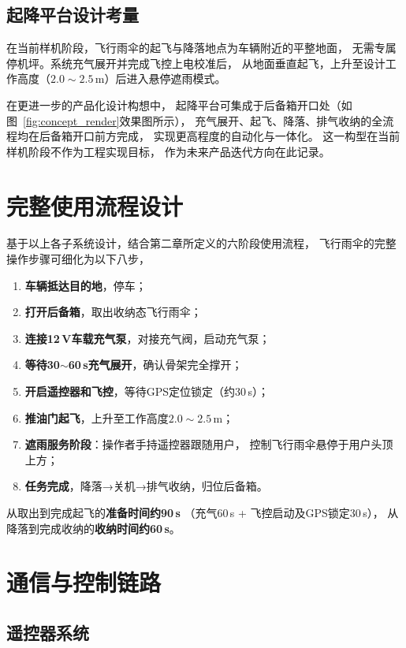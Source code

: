 \subsection{起降平台设计考量}

在当前样机阶段，飞行雨伞的起飞与降落地点为车辆附近的平整地面，
无需专属停机坪。系统充气展开并完成飞控上电校准后，
从地面垂直起飞，上升至设计工作高度（$2.0\sim2.5$\,m）后进入悬停遮雨模式。

在更进一步的产品化设计构想中，
起降平台可集成于后备箱开口处（如图~\ref{fig:concept_render}效果图所示），
充气展开、起飞、降落、排气收纳的全流程均在后备箱开口前方完成，
实现更高程度的自动化与一体化。
这一构型在当前样机阶段不作为工程实现目标，
作为未来产品迭代方向在此记录。


\section{完整使用流程设计}
基于以上各子系统设计，结合第二章所定义的六阶段使用流程，
飞行雨伞的完整操作步骤可细化为以下八步，


\begin{enumerate}
    \item \textbf{车辆抵达目的地}，停车；
    \item \textbf{打开后备箱}，取出收纳态飞行雨伞；
    \item \textbf{连接12\,V车载充气泵}，对接充气阀，启动充气泵；
    \item \textbf{等待30$\sim$60\,s充气展开}，确认骨架完全撑开；
    \item \textbf{开启遥控器和飞控}，等待GPS定位锁定（约30\,s）；
    \item \textbf{推油门起飞}，上升至工作高度$2.0\sim2.5$\,m；
    \item \textbf{遮雨服务阶段}：操作者手持遥控器跟随用户，
          控制飞行雨伞悬停于用户头顶上方；
    \item \textbf{任务完成}，降落→关机→排气收纳，归位后备箱。
\end{enumerate}

从取出到完成起飞的\textbf{准备时间约90\,s}
（充气60\,s + 飞控启动及GPS锁定30\,s），
从降落到完成收纳的\textbf{收纳时间约60\,s}。


\section{通信与控制链路}

\subsection{遥控器系统}

